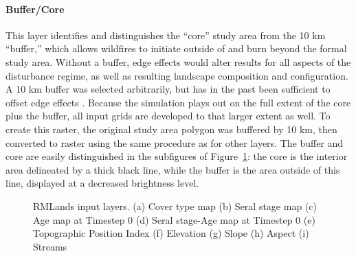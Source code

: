 \paragraph*{Buffer/Core} 
This layer identifies and distinguishes the ``core'' study area from the 10 km ``buffer,'' which allows wildfires to initiate outside of and burn beyond the formal study area. Without a buffer, edge effects would alter results for all aspects of the disturbance regime, as well as resulting landscape composition and configuration. A 10 km buffer was selected arbitrarily, but has in the past been sufficient to offset edge effects \citep{Cushman2011}. Because the simulation plays out on the full extent of the core plus the buffer, all input grids are developed to that larger extent as well. To create this raster, the original study area polygon was buffered by 10 km, then converted to raster using the same procedure as for other layers. The buffer and core are easily distinguished in the subfigures of Figure~\ref{fig:inputlayermaps}: the core is the interior area delineated by a thick black line, while the buffer is the area outside of this line, displayed at a decreased brightness level.


\begin{figure}[!htbp]
  \centering
   \qquad
	 \qquad
   \qquad
	 \qquad

  \caption{RMLands input layers. (a) Cover type map (b) Seral stage map (c) Age map at Timestep 0 (d) Seral stage-Age map at Timestep 0 (e) Topographic Position Index (f) Elevation (g) Slope (h) Aspect (i) Streams}
  \label{fig:inputlayermaps}
\end{figure}


